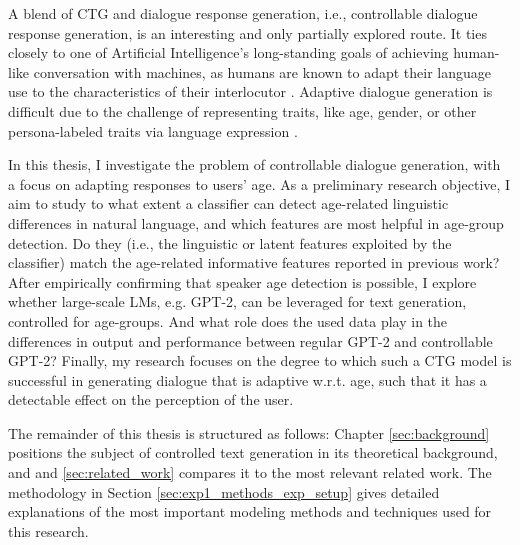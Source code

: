 A blend of CTG and dialogue response generation, i.e., controllable dialogue response generation, is an interesting and only partially explored route. It ties closely to one of Artificial Intelligence's long-standing goals of achieving human-like conversation with machines, as humans are known to adapt their language use to the characteristics of their interlocutor \citep{gallois2015communication}. Adaptive dialogue generation is difficult due to the challenge of representing traits, like age, gender, or other persona-labeled traits via language expression \citep{zheng2019personalized}.

In this thesis, I investigate the problem of controllable dialogue generation, with a focus on adapting responses to users' age. As a preliminary research objective, I aim to study to what extent a classifier can detect age-related linguistic differences in natural language, and which features are most helpful in age-group detection. Do they (i.e., the linguistic or latent features exploited by the classifier) match the age-related informative features reported in previous work? 
After empirically confirming that speaker age detection is possible, I explore whether large-scale LMs, e.g. GPT-2, can be leveraged for text generation, controlled for age-groups. And what role does the used data play in the differences in output and performance between regular GPT-2 and controllable GPT-2?
Finally, my research focuses on the degree to which such a CTG model is successful in generating dialogue that is adaptive w.r.t. age, such that it has a detectable effect on the perception of the user.

The remainder of this thesis is structured as follows: Chapter \ref{sec:background} positions the subject of controlled text generation in its theoretical background, and and \ref{sec:related_work} compares it to the most relevant related work. The methodology in Section \ref{sec:exp1_methods_exp_setup} gives detailed explanations of the most important modeling methods and techniques used for this research. 

